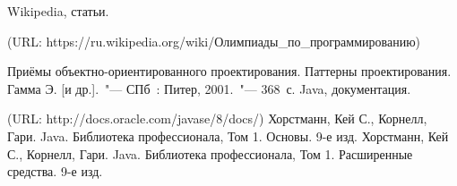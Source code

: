\renewcommand{\bibname}{Список использованных источников}
\begin{thebibliography}{9}
 Wikipedia, статьи.\par
(URL: https://ru.wikipedia.org/wiki/Олимпиады\_по\_программированию)\par
 Приёмы объектно-ориентированного проектирования. Паттерны проектирования. Гамма Э. [и др.].~"--- СПб~: Питер, 2001.~"--- 368~с.
 Java, документация.\par
(URL: http://docs.oracle.com/javase/8/docs/)
 Хорстманн, Кей С., Корнелл, Гари. Java. Библиотека профессионала, Том 1. Основы. 9-е изд.
 Хорстманн, Кей С., Корнелл, Гари. Java. Библиотека профессионала, Том 1. Расширенные средства. 9-е изд.
\end{thebibliography}